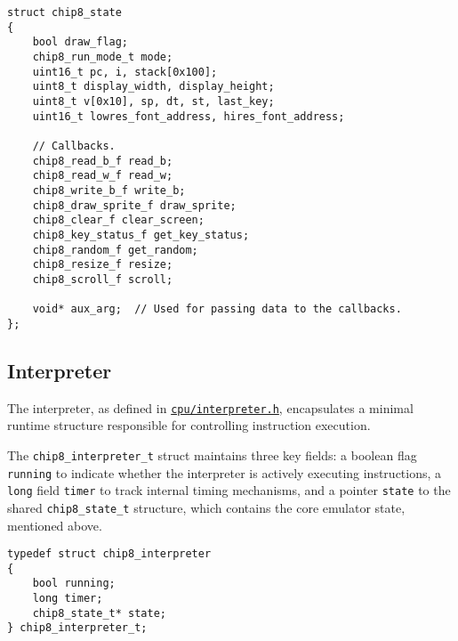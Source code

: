 \begin{verbatim}
struct chip8_state
{
    bool draw_flag;
    chip8_run_mode_t mode;
    uint16_t pc, i, stack[0x100];
    uint8_t display_width, display_height;
    uint8_t v[0x10], sp, dt, st, last_key;
    uint16_t lowres_font_address, hires_font_address;
    
    // Callbacks.
    chip8_read_b_f read_b;
    chip8_read_w_f read_w;
    chip8_write_b_f write_b;
    chip8_draw_sprite_f draw_sprite;
    chip8_clear_f clear_screen;
    chip8_key_status_f get_key_status;
    chip8_random_f get_random;
    chip8_resize_f resize;
    chip8_scroll_f scroll;
    
    void* aux_arg;  // Used for passing data to the callbacks.
};
\end{verbatim}

\clearpage

\subsection{Interpreter}
\label{subsec:ch3sec3sub1}

\par The interpreter, as defined in \href{https://github.com/solomonarul/cchip8/blob/main/inc/cchip8/cpu/interpreter.h}{\texttt{cpu/interpreter.h}}, encapsulates a minimal runtime structure responsible for controlling instruction execution.

\par The \texttt{chip8\_interpreter\_t} struct maintains three key fields: a boolean flag \texttt{running} to indicate whether the interpreter is actively executing instructions, a \texttt{long} field \texttt{timer} to track internal timing mechanisms, and a pointer \texttt{state} to the shared \texttt{chip8\_state\_t} structure, which contains the core emulator state, mentioned above.

\begin{verbatim}
typedef struct chip8_interpreter
{
    bool running;
    long timer;
    chip8_state_t* state;
} chip8_interpreter_t;
\end{verbatim}

